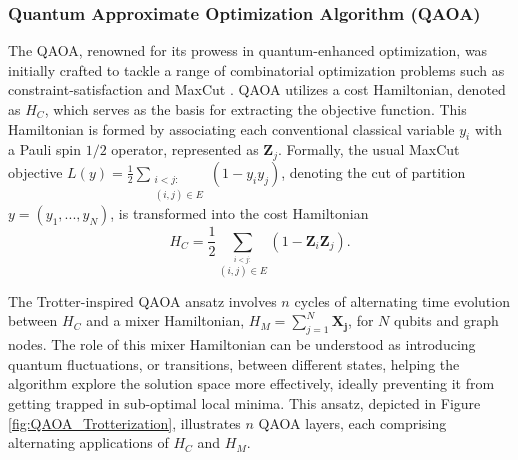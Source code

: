 
\subsubsection{Quantum Approximate Optimization Algorithm (QAOA)}
\label{sec: QAOA}

The QAOA, renowned for its prowess in quantum-enhanced optimization, was initially crafted to tackle a range of combinatorial optimization problems such as constraint-satisfaction \cite{lin2016performance} and MaxCut \cite{PhysRevA.97.022304}. QAOA utilizes a cost Hamiltonian, denoted as \(H_C\), which serves as the basis for extracting the objective function. This Hamiltonian is formed by associating each conventional classical variable $y_i$ with a Pauli spin \(1/2\) operator, represented as \(\boldsymbol{Z}_j\). Formally, the usual MaxCut objective $L(y) = \frac{1}{2}\sum_{\substack{i < j: \\ (i,j)\in E}}(1-y_{i}y_{j})$, denoting the cut of partition $y = (y_1,...,y_N)$, is transformed into the cost Hamiltonian
\begin{equation}\label{eq:H_C}\tag{6}
  H_C = \frac{1}{2}\sum_{\stackrel{i < j:}{(i,j)\in E}}(1-\boldsymbol{Z}_i\boldsymbol{Z}_j).
\end{equation}

The Trotter-inspired QAOA ansatz involves $n$ cycles of alternating time evolution between $H_C$ and a mixer Hamiltonian, $H_M = \sum_{j=1}^{N} \boldsymbol{X_j}$, for $N$ qubits and graph nodes. The role of this mixer Hamiltonian can be understood as introducing quantum fluctuations, or transitions, between different states, helping the algorithm explore the solution space more effectively, ideally preventing it from getting trapped in sub-optimal local minima. This ansatz, depicted in Figure \ref{fig:QAOA_Trotterization}, illustrates $n$ QAOA layers, each comprising alternating applications of $H_C$ and $H_M$. 

